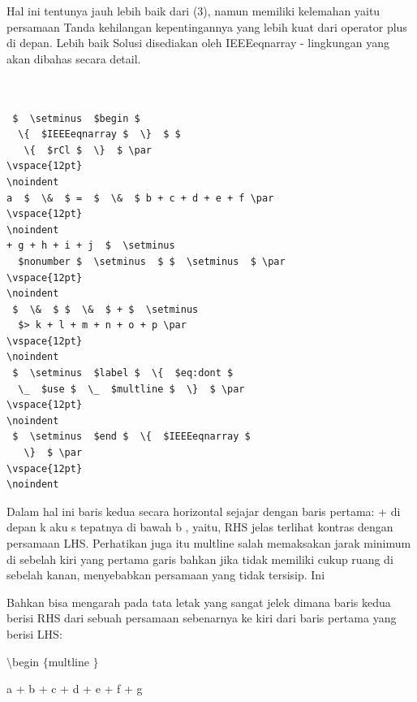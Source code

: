  \hspace*{0.5in} Hal ini tentunya jauh lebih baik dari (3), namun memiliki kelemahan yaitu persamaan Tanda kehilangan kepentingannya yang lebih kuat dari operator plus di depan. Lebih baik Solusi disediakan oleh IEEEeqnarray - lingkungan yang akan dibahas secara detail. \par
\vspace{12pt}
\noindent 
\begin{verbatim}


 $  \setminus  $begin $ 
  \{  $IEEEeqnarray $  \}  $ $ 
   \{  $rCl $  \}  $ \par
\vspace{12pt}
\noindent 
a  $  \&  $ =  $  \&  $ b + c + d + e + f \par
\vspace{12pt}
\noindent 
+ g + h + i + j  $  \setminus
  $nonumber $  \setminus  $ $  \setminus  $ \par
\vspace{12pt}
\noindent 
 $  \&  $ $  \&  $ + $  \setminus 
  $> k + l + m + n + o + p \par
\vspace{12pt}
\noindent 
 $  \setminus  $label $  \{  $eq:dont $ 
  \_  $use $  \_  $multline $  \}  $ \par
\vspace{12pt}
\noindent 
 $  \setminus  $end $  \{  $IEEEeqnarray $
   \}  $ \par
\vspace{12pt}
\noindent 
\end{verbatim}
 \hspace*{0.5in} Dalam hal ini baris kedua secara horizontal sejajar dengan baris pertama: + di depan k aku s tepatnya di bawah b , yaitu, RHS jelas terlihat kontras dengan persamaan LHS. Perhatikan juga itu multline salah memaksakan jarak minimum di sebelah kiri yang pertama garis bahkan jika tidak memiliki cukup ruang di sebelah kanan, menyebabkan persamaan yang tidak tersisip. Ini \par
\noindent 
Bahkan bisa mengarah pada tata letak yang sangat jelek dimana baris kedua berisi RHS dari sebuah persamaan sebenarnya ke kiri dari baris pertama yang berisi LHS: \par
\noindent 
 $  \setminus  $begin $  \{  $multline $  \}  $ \par
\vspace{12pt}
\noindent 
a + b + c + d + e + f + g \par
\vspace{12pt}
